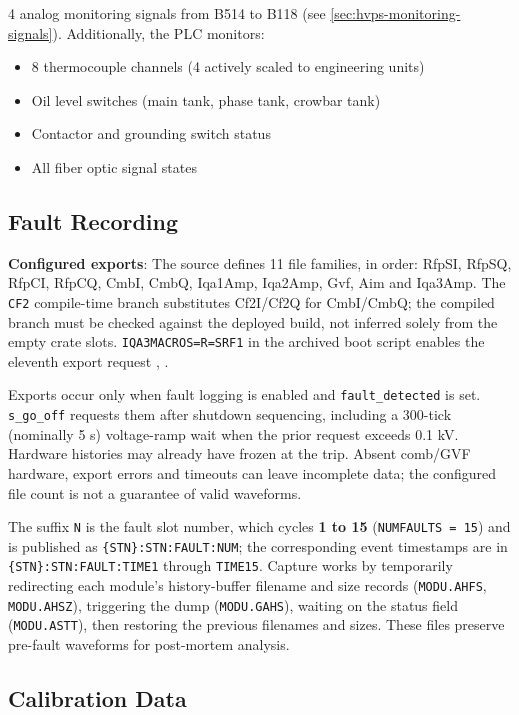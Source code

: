 4 analog monitoring signals from B514 to B118 (see \cref{sec:hvps-monitoring-signals}). Additionally, the PLC monitors:

\begin{itemize}
\tightlist
\item
  8 thermocouple channels (4 actively scaled to engineering units)
\item
  Oil level switches (main tank, phase tank, crowbar tank)
\item
  Contactor and grounding switch status
\item
  All fiber optic signal states
\end{itemize}

\subsection{Fault Recording}\label{sec:fault-recording}

\textbf{Configured exports}: The source defines 11 file families, in order: RfpSI, RfpSQ, RfpCI, RfpCQ, CmbI, CmbQ, Iqa1Amp, Iqa2Amp, Gvf, Aim and Iqa3Amp. The \texttt{CF2} compile-time branch substitutes Cf2I/Cf2Q for CmbI/CmbQ; the compiled branch must be checked against the deployed build, not inferred solely from the empty crate slots. \texttt{IQA3MACROS=R=SRF1} in the archived boot script enables the eleventh export request , .

Exports occur only when fault logging is enabled and \texttt{fault\_detected} is set. \texttt{s\_go\_off} requests them after shutdown sequencing, including a 300-tick (nominally 5 s) voltage-ramp wait when the prior request exceeds 0.1 kV. Hardware histories may already have frozen at the trip. Absent comb/GVF hardware, export errors and timeouts can leave incomplete data; the configured file count is not a guarantee of valid waveforms.

The suffix \texttt{N} is the fault slot number, which cycles \textbf{1 to 15} (\texttt{NUMFAULTS\ =\ 15}) and is published as \texttt{\{STN\}:STN:FAULT:NUM}; the corresponding event timestamps are in \texttt{\{STN\}:STN:FAULT:TIME1} through \texttt{TIME15}. Capture works by temporarily redirecting each module's history-buffer filename and size records (\texttt{MODU.AHFS}, \texttt{MODU.AHSZ}), triggering the dump (\texttt{MODU.GAHS}), waiting on the status field (\texttt{MODU.ASTT}), then restoring the previous filenames and sizes. These files preserve pre-fault waveforms for post-mortem analysis.

\subsection{Calibration Data}

